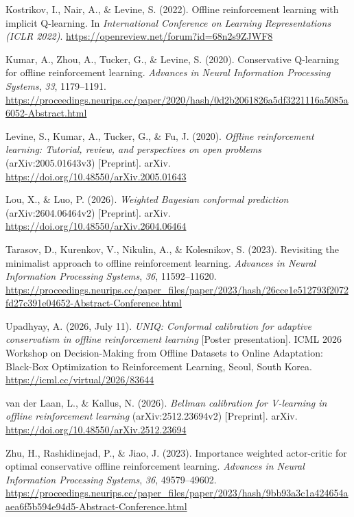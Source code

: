 \documentclass[11pt]{article}
\newenvironment{hangref}{\par\hangindent=0.5in\hangafter=1\noindent}{\par}
\begin{document}
\begin{hangref}Kostrikov, I., Nair, A., \& Levine, S. (2022). Offline reinforcement learning with implicit Q-learning. In \emph{International Conference on Learning Representations (ICLR 2022)}. \url{https://openreview.net/forum?id=68n2s9ZJWF8}\end{hangref}
\begin{hangref}Kumar, A., Zhou, A., Tucker, G., \& Levine, S. (2020). Conservative Q-learning for offline reinforcement learning. \emph{Advances in Neural Information Processing Systems}, \emph{33}, 1179--1191. \url{https://proceedings.neurips.cc/paper/2020/hash/0d2b2061826a5df3221116a5085a6052-Abstract.html}\end{hangref}
\begin{hangref}Levine, S., Kumar, A., Tucker, G., \& Fu, J. (2020). \emph{Offline reinforcement learning: Tutorial, review, and perspectives on open problems} (arXiv:2005.01643v3) [Preprint]. arXiv. \url{https://doi.org/10.48550/arXiv.2005.01643}\end{hangref}
\begin{hangref}Lou, X., \& Luo, P. (2026). \emph{Weighted Bayesian conformal prediction} (arXiv:2604.06464v2) [Preprint]. arXiv. \url{https://doi.org/10.48550/arXiv.2604.06464}\end{hangref}
\begin{hangref}Tarasov, D., Kurenkov, V., Nikulin, A., \& Kolesnikov, S. (2023). Revisiting the minimalist approach to offline reinforcement learning. \emph{Advances in Neural Information Processing Systems}, \emph{36}, 11592--11620. \url{https://proceedings.neurips.cc/paper_files/paper/2023/hash/26cce1e512793f2072fd27c391e04652-Abstract-Conference.html}\end{hangref}
\begin{hangref}Upadhyay, A. (2026, July 11). \emph{UNIQ: Conformal calibration for adaptive conservatism in offline reinforcement learning} [Poster presentation]. ICML 2026 Workshop on Decision-Making from Offline Datasets to Online Adaptation: Black-Box Optimization to Reinforcement Learning, Seoul, South Korea. \url{https://icml.cc/virtual/2026/83644}\end{hangref}
\begin{hangref}van der Laan, L., \& Kallus, N. (2026). \emph{Bellman calibration for V-learning in offline reinforcement learning} (arXiv:2512.23694v2) [Preprint]. arXiv. \url{https://doi.org/10.48550/arXiv.2512.23694}\end{hangref}
\begin{hangref}Zhu, H., Rashidinejad, P., \& Jiao, J. (2023). Importance weighted actor-critic for optimal conservative offline reinforcement learning. \emph{Advances in Neural Information Processing Systems}, \emph{36}, 49579--49602. \url{https://proceedings.neurips.cc/paper_files/paper/2023/hash/9bb93a3c1a424654aaea6f5b594e94d5-Abstract-Conference.html}\end{hangref}
\end{document}
